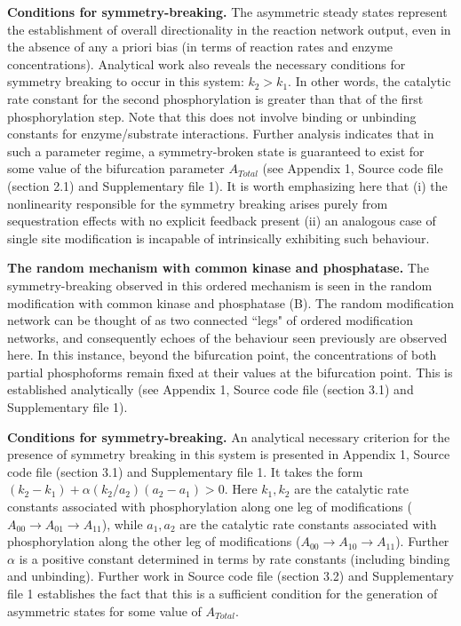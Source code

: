 \documentclass[9pt,lineno]{elife}
\begin{document}
{\bf Conditions for symmetry-breaking.} 
The asymmetric steady states represent the establishment of overall directionality in the reaction network output, even in the absence of any a priori bias (in terms of reaction rates and enzyme concentrations).
Analytical work also reveals the necessary conditions for symmetry breaking to occur in this system: $k_2 >k_1$. In other words, the catalytic rate constant for the second phosphorylation is greater than that of the first phosphorylation step. Note that this does not involve binding or unbinding constants for enzyme/substrate interactions. Further analysis indicates that in such a parameter regime, a symmetry-broken state is guaranteed to exist for some value of the bifurcation parameter $A_{Total}$ (see Appendix 1, Source code file (section 2.1) and Supplementary file 1).
It is worth emphasizing here that (i) the nonlinearity responsible for the symmetry breaking arises purely from sequestration effects with no explicit feedback present (ii) an analogous case of single site modification is incapable of intrinsically exhibiting such behaviour.

{\bf The random mechanism with common kinase and phosphatase.} The symmetry-breaking observed in this ordered mechanism is seen in the random modification with common kinase and phosphatase (B). The random modification network can be thought of as two connected ``legs" of ordered modification networks, and consequently echoes of the behaviour seen previously are observed here. In this instance, beyond the bifurcation point, the concentrations of both partial phosphoforms remain fixed at their values at the bifurcation point. This is established analytically (see Appendix 1, Source code file (section 3.1) and Supplementary file 1).

{\bf Conditions for symmetry-breaking.} An analytical necessary criterion for the presence of symmetry breaking in this system is presented in Appendix 1, Source code file (section 3.1) and Supplementary file 1. It takes the form $(k_2-k_1) + \alpha (k_2/a_2)(a_2-a_1)>0$. Here $k_1,k_2$ are the catalytic rate constants associated with phosphorylation along one leg of modifications ($A_{00} \rightarrow A_{01} \rightarrow A_{11}$), while $a_1,a_2$ are the catalytic rate constants associated with phosphorylation along the other leg of modifications ($A_{00} \rightarrow A_{10} \rightarrow A_{11}$). Further $\alpha$ is a positive constant determined in terms by rate constants (including binding and unbinding).
Further work in Source code file (section 3.2) and Supplementary file 1 establishes the fact that this is a sufficient condition for the generation of asymmetric states for some value of $A_{Total}$.
\end{document}
